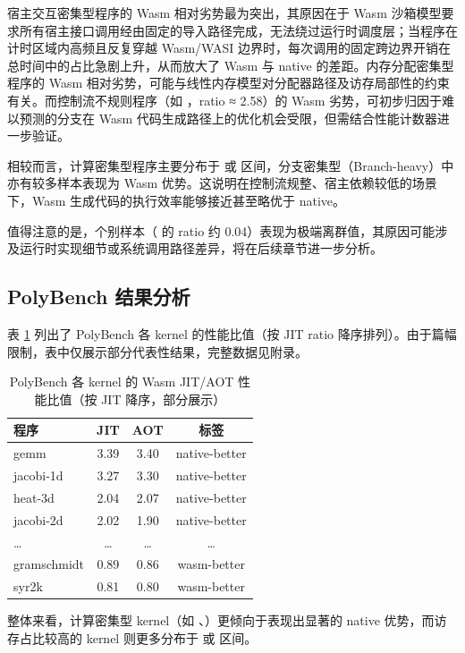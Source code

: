 宿主交互密集型程序的 Wasm 相对劣势最为突出，其原因在于 Wasm 沙箱模型要求所有宿主接口调用经由固定的导入路径完成，无法绕过运行时调度层；当程序在计时区域内高频且反复穿越 Wasm/WASI 边界时，每次调用的固定跨边界开销在总时间中的占比急剧上升，从而放大了 Wasm 与 native 的差距。内存分配密集型程序的 Wasm 相对劣势，可能与线性内存模型对分配器路径及访存局部性的约束有关。而控制流不规则程序（如 ，ratio ≈ 2.58）的 Wasm 劣势，可初步归因于难以预测的分支在 Wasm 代码生成路径上的优化机会受限，但需结合性能计数器进一步验证。

相较而言，计算密集型程序主要分布于  或  区间，分支密集型（Branch-heavy）中亦有较多样本表现为 Wasm 优势。这说明在控制流规整、宿主依赖较低的场景下，Wasm 生成代码的执行效率能够接近甚至略优于 native。

值得注意的是，个别样本（ 的 ratio 约 0.04）表现为极端离群值，其原因可能涉及运行时实现细节或系统调用路径差异，将在后续章节进一步分析。

\subsection{PolyBench 结果分析}

表 \ref{tab:polybench} 列出了 PolyBench 各 kernel 的性能比值（按 JIT ratio 降序排列）。由于篇幅限制，表中仅展示部分代表性结果，完整数据见附录。

\begin{table}[htbp]
\centering
\caption{PolyBench 各 kernel 的 Wasm JIT/AOT 性能比值（按 JIT 降序，部分展示）}
\begin{tabular}{lccc}
\toprule
程序 & JIT & AOT & 标签 \\
\midrule
gemm & 3.39 & 3.40 & native-better \\
jacobi-1d & 3.27 & 3.30 & native-better \\
heat-3d & 2.04 & 2.07 & native-better \\
jacobi-2d & 2.02 & 1.90 & native-better \\
\ldots & \ldots & \ldots & \ldots \\
gramschmidt & 0.89 & 0.86 & wasm-better \\
syr2k & 0.81 & 0.80 & wasm-better \\
\bottomrule
\end{tabular}
\label{tab:polybench}
\end{table}

整体来看，计算密集型 kernel（如 、）更倾向于表现出显著的 native 优势，而访存占比较高的 kernel 则更多分布于  或  区间。

